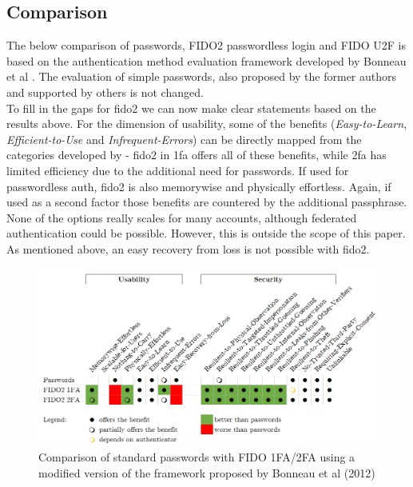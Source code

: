 \subsection{Comparison}
\label{subsec:comparison}

The below comparison of passwords, FIDO2 passwordless login and FIDO U2F is based on the authentication method evaluation framework developed by Bonneau et al \cite{bonneau2012}. The evaluation of simple passwords, also proposed by the former authors and supported by others \cite{lyastani2020} is not changed.\\
To fill in the gaps for \ac{fido2} we can now make clear statements based on the results above. For the dimension of usability, some of the benefits (\emph{Easy-to-Learn}, \emph{Efficient-to-Use} and \emph{Infrequent-Errors}) can be directly mapped from the categories developed by \cite{nielsen1993} - \ac{fido2} in \ac{1fa} offers all of these benefits, while \ac{2fa} has limited efficiency due to the additional need for passwords. If used for passwordless auth, \ac{fido2} is also memorywise and physically effortless. Again, if used as a second factor those benefits are countered by the additional passphrase. None of the options really scales for many accounts, although federated authentication could be possible. However, this is outside the scope of this paper. As mentioned above, an easy recovery from loss is not possible with \ac{fido2}.

\begin{figure}[ht]
    \centering
    \includegraphics[width=1.8\columnwidth]{Figures/bonneau_matrix.png}
    \caption[Comparison of Authentication Methods]{Comparison of standard passwords with FIDO 1FA/2FA using a modified version of the framework proposed by Bonneau et al (2012)}
    \label{fig:bonneau_matrix}
\end{figure}

